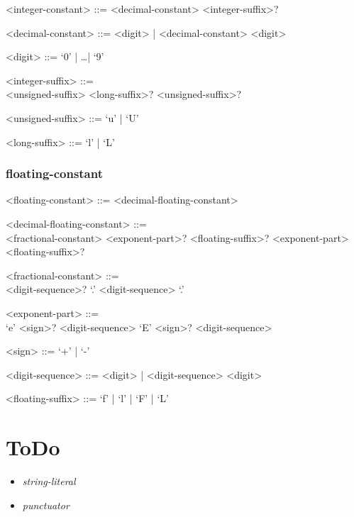 \documentclass[a4paper]{article}
\begin{document}
\begin{grammar}
	<integer-constant> ::= <decimal-constant> <integer-suffix>?

	<decimal-constant> ::= <digit> | <decimal-constant> <digit>

	<digit> ::= `0' | \dots | `9'

	<integer-suffix> ::= \hfill \\
		<unsigned-suffix> <long-suffix>?
		\alt <long-suffix> <unsigned-suffix>?
	
	<unsigned-suffix> ::= `u' | `U'

	<long-suffix> ::= `l' | `L'
	
\end{grammar}

\subsubsection{floating-constant}

\begin{grammar}
	<floating-constant> ::= <decimal-floating-constant>

	<decimal-floating-constant> ::= \hfill \\
		<fractional-constant> <exponent-part>? <floating-suffix>?
		\alt <digit-sequence> <exponent-part> <floating-suffix>?

	<fractional-constant> ::= \hfill \\ 
		<digit-sequence>? `.' <digit-sequence> 
		\alt <digit-sequence> `.'

	<exponent-part> ::= \hfill \\
		`e' <sign>? <digit-sequence>
		\alt `E' <sign>? <digit-sequence>
	
	<sign> ::= `+' | `-'

	<digit-sequence> ::= <digit> | <digit-sequence> <digit>

	<floating-suffix> ::= `f' | `l' | `F' | `L'
\end{grammar}

\section{ToDo}
\begin{itemize}
	\item \emph{string-literal}
	\item \emph{punctuator}
\end{itemize}
	
\end{document}
